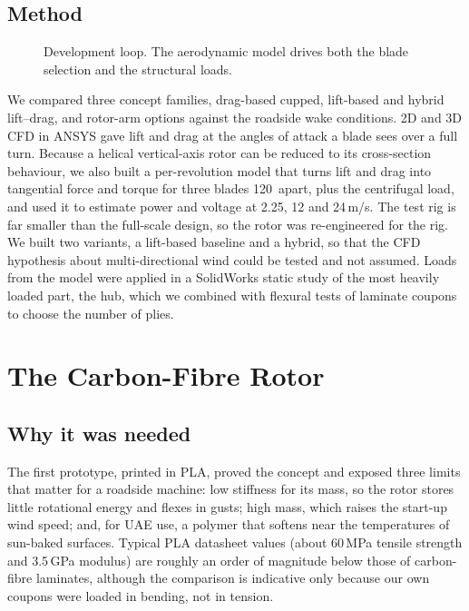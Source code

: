 \documentclass[11pt,letterpaper]{article}
\begin{document}
\subsection{Method}
\begin{figure}[t]\centering
{}
\caption{Development loop. The aerodynamic model drives both the blade selection and the structural loads.}\label{fig:loop}
\end{figure}
We compared three concept families, drag-based cupped, lift-based and hybrid lift--drag, and rotor-arm options against the roadside wake conditions. 2D and 3D CFD in ANSYS gave lift and drag at the angles of attack a blade sees over a full turn. Because a helical vertical-axis rotor can be reduced to its cross-section behaviour, we also built a per-revolution model that turns lift and drag into tangential force and torque for three blades 120\textdegree\ apart, plus the centrifugal load, and used it to estimate power and voltage at 2.25, 12 and 24\,m/s. The test rig is far smaller than the full-scale design, so the rotor was re-engineered for the rig. We built two variants, a lift-based baseline and a hybrid, so that the CFD hypothesis about multi-directional wind could be tested and not assumed. Loads from the model were applied in a SolidWorks static study of the most heavily loaded part, the hub, which we combined with flexural tests of laminate coupons to choose the number of plies.

\section{The Carbon-Fibre Rotor}\label{sec:cf}
\subsection{Why it was needed}
The first prototype, printed in PLA, proved the concept and exposed three limits that matter for a roadside machine: low stiffness for its mass, so the rotor stores little rotational energy and flexes in gusts; high mass, which raises the start-up wind speed; and, for UAE use, a polymer that softens near the temperatures of sun-baked surfaces. Typical PLA datasheet values (about 60\,MPa tensile strength and 3.5\,GPa modulus) are roughly an order of magnitude below those of carbon-fibre laminates, although the comparison is indicative only because our own coupons were loaded in bending, not in tension.
\end{document}
